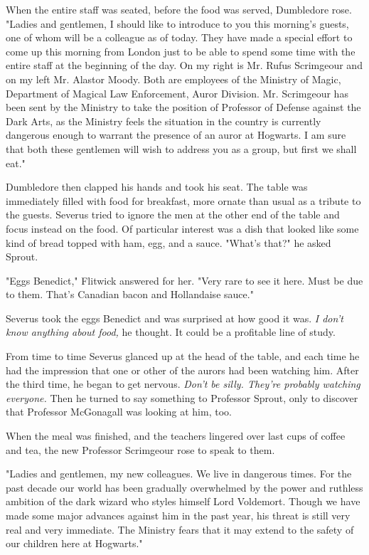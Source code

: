 When the entire staff was seated, before the food was served, Dumbledore rose. "Ladies and gentlemen, I should like to introduce to you this morning's guests, one of whom will be a colleague as of today. They have made a special effort to come up this morning from London just to be able to spend some time with the entire staff at the beginning of the day. On my right is Mr. Rufus Scrimgeour and on my left Mr. Alastor Moody. Both are employees of the Ministry of Magic, Department of Magical Law Enforcement, Auror Division. Mr. Scrimgeour has been sent by the Ministry to take the position of Professor of Defense against the Dark Arts, as the Ministry feels the situation in the country is currently dangerous enough to warrant the presence of an auror at Hogwarts. I am sure that both these gentlemen will wish to address you as a group, but first we shall eat."

Dumbledore then clapped his hands and took his seat. The table was immediately filled with food for breakfast, more ornate than usual as a tribute to the guests. Severus tried to ignore the men at the other end of the table and focus instead on the food. Of particular interest was a dish that looked like some kind of bread topped with ham, egg, and a sauce. "What's that?" he asked Sprout.

"Eggs Benedict," Flitwick answered for her. "Very rare to see it here. Must be due to them. That's Canadian bacon and Hollandaise sauce."

Severus took the eggs Benedict and was surprised at how good it was. \emph{I don't know anything about food,} he thought. It could be a profitable line of study.

From time to time Severus glanced up at the head of the table, and each time he had the impression that one or other of the aurors had been watching him. After the third time, he began to get nervous. \emph{Don't be silly. They're probably watching everyone.} Then he turned to say something to Professor Sprout, only to discover that Professor McGonagall was looking at him, too.

When the meal was finished, and the teachers lingered over last cups of coffee and tea, the new Professor Scrimgeour rose to speak to them.

"Ladies and gentlemen, my new colleagues. We live in dangerous times. For the past decade our world has been gradually overwhelmed by the power and ruthless ambition of the dark wizard who styles himself Lord Voldemort. Though we have made some major advances against him in the past year, his threat is still very real and very immediate. The Ministry fears that it may extend to the safety of our children here at Hogwarts."

